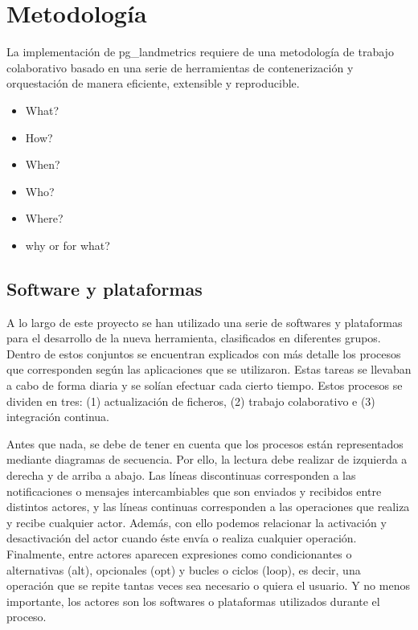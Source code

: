 

\chapter{Metodología}\label{chap:metod}

La implementación de pg\_landmetrics requiere de una metodología de trabajo colaborativo basado en una serie de herramientas de contenerización y orquestación de manera eficiente, extensible y reproducible.

\begin{graybox}
\begin{itemize}
\item What?
\item How?
\item When?
\item Who?
\item Where?
\item why or for what?
\end{itemize}
\end{graybox}


\section{Software y plataformas}
A lo largo de este proyecto se han utilizado una serie de softwares y plataformas para el desarrollo de la nueva herramienta, clasificados en diferentes grupos. Dentro de estos conjuntos se encuentran explicados con más detalle los procesos que corresponden según las aplicaciones que se utilizaron.  Estas tareas se llevaban a cabo de forma diaria y se solían efectuar cada cierto tiempo. Estos procesos se dividen en tres: (1) actualización de ficheros, (2) trabajo colaborativo e (3) integración continua.

Antes que nada, se debe de tener en cuenta que los procesos están representados mediante diagramas de secuencia. Por ello, la lectura debe realizar de izquierda a derecha y de arriba a abajo. Las líneas discontinuas corresponden a las notificaciones o mensajes intercambiables que son enviados y recibidos entre distintos actores, y las líneas continuas corresponden a las operaciones que realiza y recibe cualquier actor. Además, con ello podemos relacionar la activación y desactivación del actor cuando éste envía o realiza cualquier operación. Finalmente, entre actores aparecen expresiones como condicionantes o alternativas (alt), opcionales (opt) y bucles o ciclos (loop), es decir, una operación que se repite tantas veces sea necesario o quiera el usuario. Y no menos importante, los actores son los softwares o plataformas utilizados durante el proceso.

